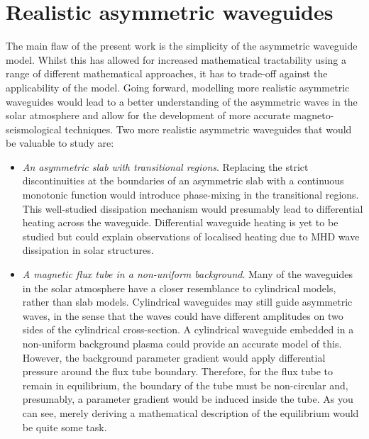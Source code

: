\section{Realistic asymmetric waveguides}
The main flaw of the present work is the simplicity of the asymmetric waveguide model. Whilst this has allowed for increased mathematical tractability using a range of different mathematical approaches, it has to trade-off against the applicability of the model. Going forward, modelling more realistic asymmetric waveguides would lead to a better understanding of the asymmetric waves in the solar atmosphere and allow for the development of more accurate magneto-seismological techniques. Two more realistic asymmetric waveguides that would be valuable to study are:
\begin{itemize}
	\item \textit{An asymmetric slab with transitional regions}. Replacing the strict discontinuities at the boundaries of an asymmetric slab with a continuous monotonic function would introduce phase-mixing in the transitional regions. This well-studied dissipation mechanism  would presumably lead to differential heating across the waveguide. Differential waveguide heating is yet to be studied but could explain observations of localised heating due to MHD wave dissipation in solar structures.
	\item \textit{A magnetic flux tube in a non-uniform background}. Many of the waveguides in the solar atmosphere have a closer resemblance to cylindrical models, rather than slab models. Cylindrical waveguides may still guide asymmetric waves, in the sense that the waves could have different amplitudes on two sides of the cylindrical cross-section. A cylindrical waveguide embedded in a non-uniform background plasma could provide an accurate model of this. However, the background parameter gradient would apply differential pressure around the flux tube boundary. Therefore, for the flux tube to remain in equilibrium, the boundary of the tube must be non-circular and, presumably, a parameter gradient would be induced inside the tube. As you can see, merely deriving a mathematical description of the equilibrium would be quite some task.
\end{itemize}


%
%
